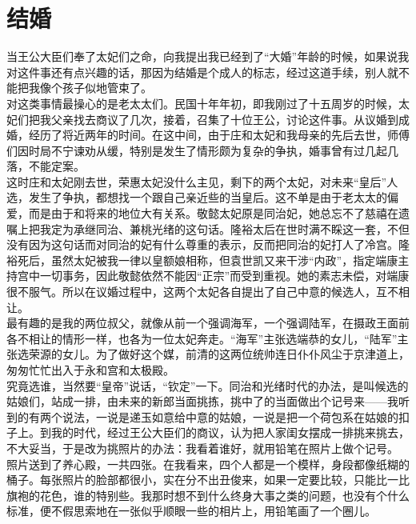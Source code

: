 \fancyhead[RO]{} %
\fancyhead[LE]{} %
\chapter*{结婚}
\thispagestyle{empty}
当王公大臣们奉了太妃们之命，向我提出我已经到了“大婚”年龄的时候，如果说我对这件事还有点兴趣的话，那因为结婚是个成人的标志，经过这道手续，别人就不能把我像个孩子似地管束了。\\

对这类事情最操心的是老太太们。民国十年年初，即我刚过了十五周岁的时候，太妃们把我父亲找去商议了几次，接着，召集了十位王公，讨论这件事。从议婚到成婚，经历了将近两年的时间。在这中间，由于庄和太妃和我母亲的先后去世，师傅们因时局不宁谏劝从缓，特别是发生了情形颇为复杂的争执，婚事曾有过几起几落，不能定案。\\

这时庄和太妃刚去世，荣惠太妃没什么主见，剩下的两个太妃，对未来“皇后”人选，发生了争执，都想找一个跟自己亲近些的当皇后。这不单是由于老太太的偏爱，而是由于和将来的地位大有关系。敬懿太妃原是同治妃，她总忘不了慈禧在遗嘱上把我定为承继同治、兼桃光绪的这句话。隆裕太后在世时满不睬这一套，不但没有因为这句话而对同治的妃有什么尊重的表示，反而把同治的妃打人了冷宫。隆裕死后，虽然太妃被我一律以皇额娘相称，但袁世凯又来干涉“内政”，指定端康主持宫中一切事务，因此敬懿依然不能因“正宗”而受到重视。她的素志未偿，对端康很不服气。所以在议婚过程中，这两个太妃各自提出了自己中意的候选人，互不相让。\\

最有趣的是我的两位叔父，就像从前一个强调海军，一个强调陆军，在摄政王面前各不相让的情形一样，也各为一位太妃奔走。“海军”主张选端恭的女儿，“陆军”主张选荣源的女儿。为了做好这个媒，前清的这两位统帅连日仆仆风尘于京津道上，匆匆忙忙出入于永和宫和太极殿。\\

究竟选谁，当然要“皇帝”说话，“钦定”一下。同治和光绪时代的办法，是叫候选的姑娘们，站成一排，由未来的新郎当面挑拣，挑中了的当面做出个记号来——我听到的有两个说法，一说是递玉如意给中意的姑娘，一说是把一个荷包系在姑娘的扣子上。到我的时代，经过王公大臣们的商议，认为把人家闺女摆成一排挑来挑去，不大妥当，于是改为挑照片的办法：我看着谁好，就用铅笔在照片上做个记号。\\

照片送到了养心殿，一共四张。在我看来，四个人都是一个模样，身段都像纸糊的桶子。每张照片的脸部都很小，实在分不出丑俊来，如果一定要比较，只能比一比旗袍的花色，谁的特别些。我那时想不到什么终身大事之类的问题，也没有个什么标准，便不假思索地在一张似乎顺眼一些的相片上，用铅笔画了一个圈儿。\\

